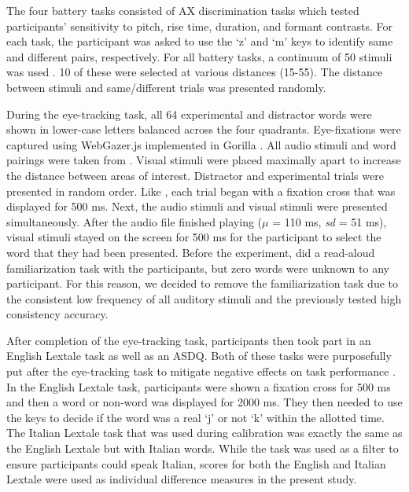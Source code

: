The four battery tasks consisted of AX discrimination tasks which tested participants' sensitivity to pitch, rise time, duration, and formant contrasts. For each task, the participant was asked to use the `z' and `m' keys to identify same and different pairs, respectively. For all battery tasks, a continuum of 50 stimuli was used \citep{Krizman_2019}. 10 of these were selected at various distances (15-55). The distance between stimuli and same/different trials was presented randomly.

During the eye-tracking task, all 64 experimental and distractor words were shown in lower-case letters balanced across the four quadrants. Eye-fixations were captured using WebGazer.js \citep{Papoutsaki} implemented in Gorilla \citep{Anwyl-Irvine_2019}. All audio stimuli and word pairings were taken from \cite{Sulpizio_McQueen_2012}. Visual stimuli were placed maximally apart to increase the distance between areas of interest. Distractor and experimental trials were presented in random order. Like \cite{Sulpizio_McQueen_2012}, each trial began with a fixation cross that was displayed for 500 ms. Next, the audio stimuli and visual stimuli were presented simultaneously. After the audio file finished playing ($\mu$ = 110 ms, \textit{sd} = 51 ms), visual stimuli stayed on the screen for 500 ms for the participant to select the word that they had been presented. Before the experiment, \cite{Sulpizio_McQueen_2012} did a read-aloud familiarization task with the participants, but zero words were unknown to any participant. For this reason, we decided to remove the familiarization task due to the consistent low frequency of all auditory stimuli and the previously tested high consistency accuracy.

After completion of the eye-tracking task, participants then took part in an English Lextale task as well as an ASDQ. Both of these tasks were purposefully put after the eye-tracking task to mitigate negative effects on task performance \citep{Chang_2024}. In the English Lextale task, participants were shown a fixation cross for 500 ms and then a word or non-word was displayed for 2000 ms. They then needed to use the keys to decide if the word was a real `j' or not `k' within the allotted time. The Italian Lextale task that was used during calibration was exactly the same as the English Lextale but with Italian words. While the task was used as a filter to ensure participants could speak Italian, scores for both the English and Italian Lextale were used as individual difference measures in the present study.

